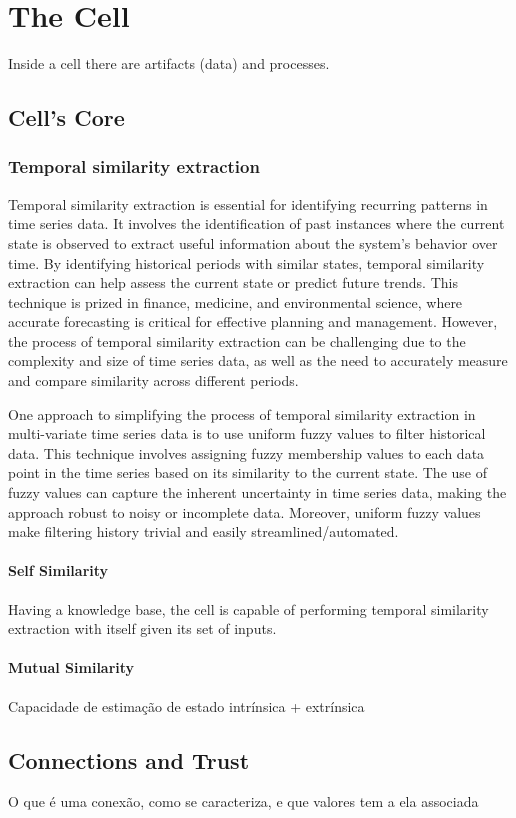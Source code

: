 \section{The Cell}

Inside a cell there are artifacts (data) and processes.

\subsection{Cell's Core}

\subsubsection{Temporal similarity extraction}

Temporal similarity extraction is essential for identifying recurring patterns in time series data. It involves the identification of past instances where the current state is observed to extract useful information about the system's behavior over time. By identifying historical periods with similar states, temporal similarity extraction can help assess the current state or predict future trends. This technique is prized in finance, medicine, and environmental science, where accurate forecasting is critical for effective planning and management. However, the process of temporal similarity extraction can be challenging due to the complexity and size of time series data, as well as the need to accurately measure and compare similarity across different periods.

One approach to simplifying the process of temporal similarity extraction in multi-variate time series data is to use uniform fuzzy values to filter historical data. This technique involves assigning fuzzy membership values to each data point in the time series based on its similarity to the current state. The use of fuzzy values can capture the inherent uncertainty in time series data, making the approach robust to noisy or incomplete data. Moreover, uniform fuzzy values make filtering history trivial and easily streamlined/automated.


\paragraph{Self Similarity}

Having a knowledge base, the cell is capable of performing temporal similarity extraction with itself given its set of inputs.

\paragraph{Mutual Similarity}
Capacidade de estimação de estado intrínsica + extrínsica

\subsection{Connections and Trust}
O que é uma conexão, como se caracteriza, e que valores tem a ela associada
